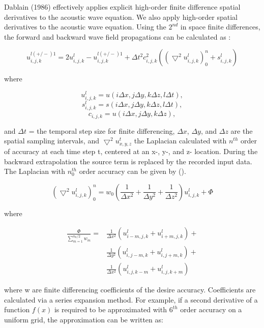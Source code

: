 Dablain (1986) effectively applies explicit high-order finite
difference spatial derivatives to the acoustic wave equation.
We also apply high-order spatial derivatives to the acoustic
wave equation. Using the \( 2^{nd} \) in space finite differences, the
forward and backward wave field propagations can be calculated as
\cite{rtm_psdm}:

\begin{equation}
  u ^{l(+/-)1} _{i,j,k} = 2u^l _{i,j,k} - u^{l(+/-)1} _{i,j,k} + \Delta t^2
  c^2 _{i,j,k} (\left( \bigtriangledown ^2 u ^l _{i,j,k}  \right) ^ n_0 +
  s ^l _{i,j,k})
\end{equation}

where

\[u^l _{i,j,k} = u(i\Delta x, j \Delta y, k \Delta z, l \Delta t),\]
\[ s^l _{i,j,k} = s(i\Delta x, j \Delta y, k \Delta z, l \Delta t),\]
\[ c_{i,j,k} = u(i\Delta x, j \Delta y, k \Delta z), \]

and \( \Delta t \) =  the temporal step size for finite differencing, \(
\Delta x \), \( \Delta y \), and \( \Delta z \) are the spatial sampling
intervals, and \( \bigtriangledown ^2 u^t _{x, y, z} \) the Laplacian
calculated with \( n^{th} \) order of accuracy at each time step t,
centered at an x-, y-, and z- location. During the backward extrapolation
the source
term is replaced by the recorded input data. The Laplacian with
\( n^{th} _0 \) order accuracy can be given by ().

\begin{equation}
  (\bigtriangledown ^2 u ^l _{i,j,k})^n_0 = w_0(\frac{1}{\Delta x^2} +
  \frac{1}{\Delta y^2} + \frac{1}{\Delta z^2})u^l _{i, j, k} + \Phi
\end{equation}

where

\begin{equation}
  \begin{split}
    \frac{\Phi}{\sum_{m=1} ^{n_0 / 2}w_m} =
      &\frac{1}{\Delta x^2}\left(u^l _{i-m, j, k}+ u ^l _{i+m, j, k}
      \right) + \\
      &\frac{1}{\Delta y^2}\left(u^l _{i, j-m, k}+ u ^l _{i, j+m, k}
      \right) + \\
      &\frac{1}{\Delta x^2}\left(u^l _{i, j, k-m}+ u ^l _{i, j, k+m} \right)
  \end{split}
\end{equation}

where w are finite differencing coefficients of the desire
accuracy. Coefficients are calculated via a series expansion
method. For example, if a second derivative of a function
\( f(x) \) is required to be approximated with \( 6^{th} \) order accuracy
on a uniform grid, the approximation can be written as:

